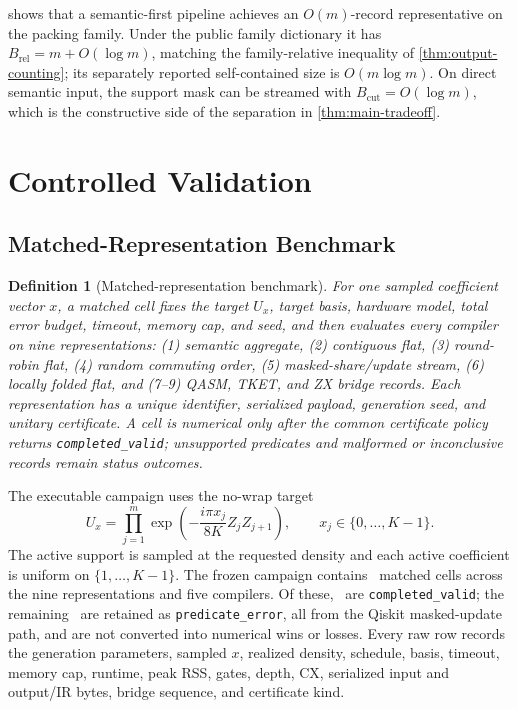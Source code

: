 \documentclass[a4paper,twocolumn,10pt,unpublished]{quantumarticle}
\newtheorem{definition}{Definition}
\begin{document}
 shows that a semantic-first pipeline
achieves an $O(m)$-record representative on the packing family.  Under the
public family dictionary it has
$B_{\mathrm{rel}}=m+O(\log m)$, matching the
family-relative inequality of \cref{thm:output-counting}; its separately
reported self-contained size is $O(m\log m)$.  On direct semantic input,
the support mask can be streamed with $B_{\mathrm{cut}}=O(\log m)$, which
is the constructive side of the separation in
\cref{thm:main-tradeoff}.


\section{Controlled Validation}
\label{sec:validation}

\subsection{Matched-Representation Benchmark}

\begin{definition}[Matched-representation benchmark]
\label{def:matched-benchmark}
For one sampled coefficient vector $x$, a matched cell fixes the target
$U_x$, target basis, hardware model, total error budget, timeout, memory cap,
and seed, and then evaluates every compiler on nine representations:
(1) semantic aggregate, (2) contiguous flat, (3) round-robin flat,
(4) random commuting order, (5) masked-share/update stream, (6) locally
folded flat, and (7--9) QASM, TKET, and ZX bridge records.  Each representation
has a unique identifier, serialized payload, generation seed, and unitary
certificate.  A cell is numerical only after the common certificate policy
returns \texttt{completed\_valid}; unsupported predicates and malformed or
inconclusive records remain status outcomes.
\end{definition}

The executable campaign uses the no-wrap target
\begin{equation*}
 U_x=\prod_{j=1}^{m}\exp\!\left(-\frac{i\pi x_j}{8K}Z_jZ_{j+1}\right),
 \qquad x_j\in\{0,\ldots,K-1\}.
\end{equation*}
The active support is sampled at the requested density and each active
coefficient is uniform on $\{1,\ldots,K-1\}$.  The frozen campaign contains
\MatchedCells\ matched cells across the nine representations and five
compilers.  Of these, \MatchedCompleted\ are
\texttt{completed\_valid}; the remaining \MatchedPredicateErrors\ are retained
as \texttt{predicate\_error}, all from the Qiskit masked-update path, and are
not converted into numerical wins or losses.  Every raw row records the
generation parameters, sampled $x$, realized density, schedule, basis,
timeout, memory cap, runtime, peak RSS, gates, depth, CX, serialized input and
output/IR bytes, bridge sequence, and certificate kind.
\end{document}
